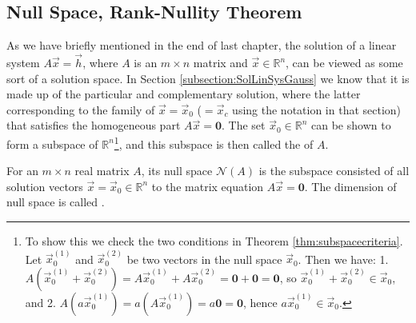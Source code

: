 \subsection{Null Space, Rank-Nullity Theorem}
\label{section:null}

As we have briefly mentioned in the end of last chapter, the solution of a linear system $A\vec{x} = \vec{h}$, where $A$ is an $m \times n$ matrix and $\vec{x} \in \mathbb{R}^n$, can be viewed as some sort of a solution space. In Section \ref{subsection:SolLinSysGauss} we know that it is made up of the particular and complementary solution, where the latter corresponding to the family of $\vec{x} = \vec{x}_0$ ($= \vec{x}_c$ using the notation in that section) that satisfies the homogeneous part $A\vec{x} = \textbf{0}$. The set $\vec{x}_0 \in \mathbb{R}^n$ can be shown to form a subspace of $\mathbb{R}^n$\footnote{To show this we check the two conditions in Theorem \ref{thm:subspacecriteria}. Let $\vec{x}_0^{(1)}$ and $\vec{x}_0^{(2)}$ be two vectors in the null space $\vec{x}_0$. Then we have: 1. $A(\vec{x}_0^{(1)} + \vec{x}_0^{(2)}) = A\vec{x}_0^{(1)} + A\vec{x}_0^{(2)} = \textbf{0} + \textbf{0} = \textbf{0}$, so $\vec{x}_0^{(1)} + \vec{x}_0^{(2)} \in \vec{x}_0$, and 2. $A(a\vec{x}_0^{(1)}) = a(A\vec{x}_0^{(1)}) = a\textbf{0} = \textbf{0}$, hence $a\vec{x}_0^{(1)} \in \vec{x}_0$.}, and this subspace is then called the  of $A$.
\begin{defn}
\label{defn:nullspace}
For an $m \times n$ real matrix $A$, its null space $\mathcal{N}(A)$ is the subspace consisted of all solution vectors $\vec{x} = \vec{x}_0 \in \mathbb{R}^n$ to the matrix equation $A\vec{x} = \textbf{0}$. The dimension of null space is called .
\end{defn}
